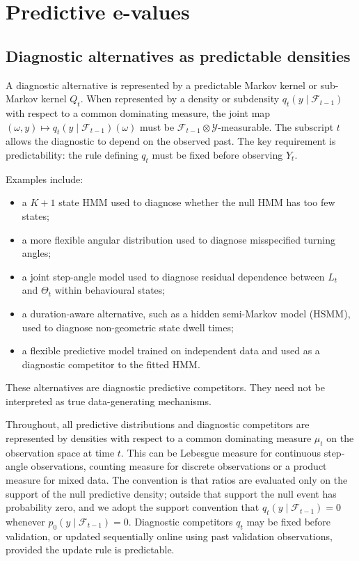 \documentclass[pdflatex,sn-basic]{sn-jnl}
\theoremstyle{thmstyleone}
\theoremstyle{thmstyletwo}
\theoremstyle{thmstylethree}
\newcommand{\1}{\mathbf 1}
\newcommand{\calF}{\mathcal F}
\newcommand{\calY}{\mathcal Y}
\begin{document}
\section{Predictive e-values}
\label{sec:evalues}

\subsection{Diagnostic alternatives as predictable densities}

A diagnostic alternative is represented by a predictable Markov kernel or sub-Markov kernel $Q_t$. When represented by a density or subdensity $q_t(y\mid\calF_{t-1})$ with respect to a common dominating measure, the joint map $(\omega, y) \mapsto q_t(y\mid\calF_{t-1})(\omega)$ must be $\calF_{t-1} \otimes \calY$-measurable. The subscript $t$ allows the diagnostic to depend on the observed past. The key requirement is predictability: the rule defining $q_t$ must be fixed before observing $Y_t$.

Examples include:
\begin{itemize}[leftmargin=1.5em]
\item a $K+1$ state HMM used to diagnose whether the null HMM has too few states;
\item a more flexible angular distribution used to diagnose misspecified turning angles;
\item a joint step-angle model used to diagnose residual dependence between $L_t$ and $\Theta_t$ within behavioural states;
\item a duration-aware alternative, such as a hidden semi-Markov model (HSMM), used to diagnose non-geometric state dwell times;
\item a flexible predictive model trained on independent data and used as a diagnostic competitor to the fitted HMM.
\end{itemize}
These alternatives are diagnostic predictive competitors. They need not be interpreted as true data-generating mechanisms.

Throughout, all predictive distributions and diagnostic competitors are represented by densities with respect to a common dominating measure $\mu_t$ on the observation space at time $t$. This can be Lebesgue measure for continuous step-angle observations, counting measure for discrete observations or a product measure for mixed data. The convention is that ratios are evaluated only on the support of the null predictive density; outside that support the null event has probability zero, and we adopt the support convention that $q_t(y\mid\calF_{t-1}) = 0$ whenever $p_0(y\mid\calF_{t-1}) = 0$. Diagnostic competitors $q_t$ may be fixed before validation, or updated sequentially online using past validation observations, provided the update rule is predictable.
\end{document}

